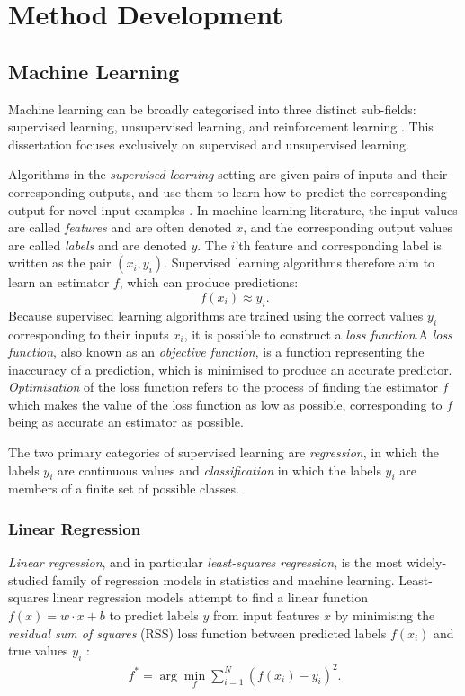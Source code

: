 \documentclass{report}
\begin{document}
\section{Method Development}

\subsection{Machine Learning}

Machine learning can be broadly categorised into three distinct sub-fields: supervised learning, unsupervised learning, and reinforcement learning \cite{jordan2015machine}. This dissertation focuses exclusively on supervised and unsupervised learning.

Algorithms in the \textit{supervised learning} setting are given pairs of inputs and their corresponding outputs, and use them to learn how to predict the corresponding output for novel input examples \cite{bishop2006pattern}. In machine learning literature, the input values are called \textit{features} and are often denoted $x$, and the corresponding output values are called \textit{labels} and are denoted $y$. The $i$'th feature and corresponding label is written as the pair $(x_i, y_i)$. Supervised learning algorithms therefore aim to learn an estimator $f$, which can produce predictions:
\[
    f(x_i) \approx y_i.
\]
Because supervised learning algorithms are trained using the correct values $y_i$ corresponding to their inputs $x_i$, it is possible to construct a \textit{loss function}.A \textit{loss function}, also known as an \textit{objective function}, is a function representing the inaccuracy of a prediction, which is minimised to produce an accurate predictor. \textit{Optimisation} of the loss function refers to the process of finding the estimator $f$ which makes the value of the loss function as low as possible, corresponding to $f$ being as accurate an estimator as possible.

The two primary categories of supervised learning are \textit{regression}, in which the labels $y_i$ are continuous values and \textit{classification} in which the labels $y_i$ are members of a finite set of possible classes.

\subsubsection{Linear Regression}

\textit{Linear regression}, and in particular \textit{least-squares regression}, is the most widely-studied family of regression models in statistics and machine learning. Least-squares linear regression models attempt to find a linear function $f(x) = w \cdot x + b$ to predict labels $y$ from input features $x$ by minimising the \textit{residual sum of squares} (RSS) loss function between predicted labels $f(x_i)$ and true values $y_i$ \cite{hastie2009elements}:
\begin{align}
f^* = \arg\min_f \sum_{i=1}^N \left(f(x_i) 
 - y_i \right)^2.\label{eq:ols-rss-error}
\end{align}
\end{document}
